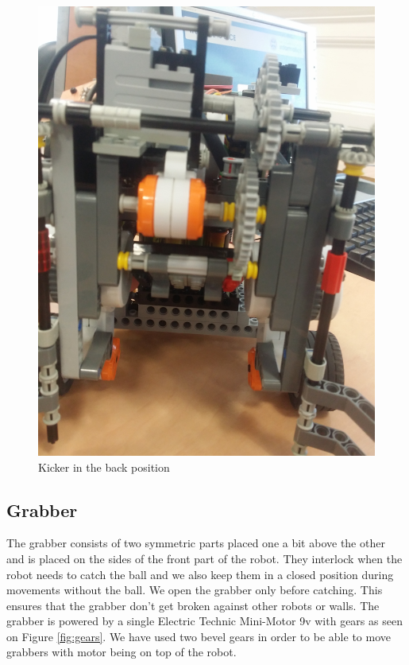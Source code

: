 \documentclass[12pt]{article}
\begin{document}
\begin{figure}[ht]
\begin{minipage}[b]{.3\textwidth}
	\end{minipage}
	~
	\begin{minipage}[b]{.3\textwidth}
        \centering
		\includegraphics[scale=0.04, angle=-90]{kick_back.jpg}
		\caption{Kicker in the back position}
		\label{fig:kicker_back}
	\end{minipage}
	
\end{figure}
\subsection{Grabber}
The grabber consists of two symmetric parts placed one a bit above the other and is placed on the sides of the front part of the robot. They interlock when the robot needs to catch the ball and we also keep them in a closed position during movements without the ball. We open the grabber only before catching. This ensures that the grabber don't get broken against other robots or walls. The grabber is powered by a single Electric Technic Mini-Motor 9v with gears as seen on Figure \ref{fig:gears}. We have used two bevel gears in order to be able to move grabbers with motor being on top of the robot. 
\end{document}
